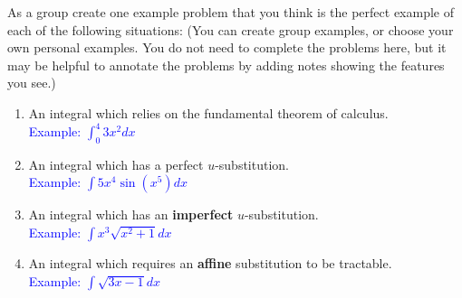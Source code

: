 \documentclass{ximera}
\begin{document}
\begin{exercise}
    As a group create one example problem that you think is the perfect example of each of the following situations: (You can create group examples, or choose your own personal examples. You do not need to complete the problems here, but it may be helpful to annotate the problems by adding notes showing the features you see.)
        \begin{enumerate}
            \item An integral which relies on the fundamental theorem of calculus.\\
            \textcolor{blue}{ Example: $\int_0^4 3x^2dx$}

            \item An integral which has a perfect $u$-substitution.\\
            \textcolor{blue}{ Example: $\int5x^4\sin(x^5)dx$}

            \item An integral which has an {\bf{imperfect}} $u$-substitution.\\
            \textcolor{blue}{ Example: $\int x^3\sqrt{x^2+1}dx$}

            \item An integral which requires an {\bf{affine}} substitution to be tractable.\\
            \textcolor{blue}{ Example: $\int \sqrt{3x-1}dx$}
        \end{enumerate}
\end{exercise}
\end{document}
